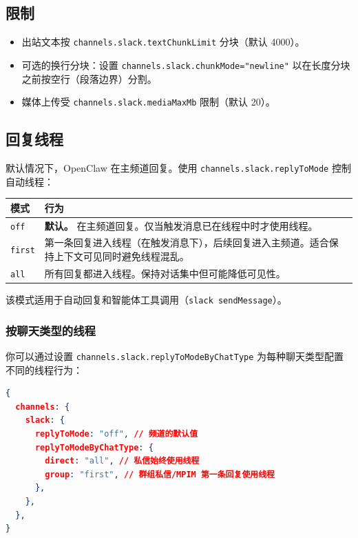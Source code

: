 \subsection{限制}


\begin{itemize}
  \item 出站文本按 \texttt{channels.slack.textChunkLimit} 分块（默认 4000）。
  \item 可选的换行分块：设置 \texttt{channels.slack.chunkMode="newline"} 以在长度分块之前按空行（段落边界）分割。
  \item 媒体上传受 \texttt{channels.slack.mediaMaxMb} 限制（默认 20）。
\end{itemize}


\subsection{回复线程}


默认情况下，OpenClaw 在主频道回复。使用 \texttt{channels.slack.replyToMode} 控制自动线程：


\begin{table}[h]
\centering
\small
\begin{tabular}{|l|l|}
\hline
模式 & 行为 \\
\hline
\texttt{off} & \textbf{默认。} 在主频道回复。仅当触发消息已在线程中时才使用线程。 \\
\hline
\texttt{first} & 第一条回复进入线程（在触发消息下），后续回复进入主频道。适合保持上下文可见同时避免线程混乱。 \\
\hline
\texttt{all} & 所有回复都进入线程。保持对话集中但可能降低可见性。 \\
\hline
\end{tabular}
\end{table}



该模式适用于自动回复和智能体工具调用（\texttt{slack sendMessage}）。

\subsubsection{按聊天类型的线程}


你可以通过设置 \texttt{channels.slack.replyToModeByChatType} 为每种聊天类型配置不同的线程行为：

\begin{lstlisting}[language=json]
{
  channels: {
    slack: {
      replyToMode: "off", // 频道的默认值
      replyToModeByChatType: {
        direct: "all", // 私信始终使用线程
        group: "first", // 群组私信/MPIM 第一条回复使用线程
      },
    },
  },
}
\end{lstlisting}


